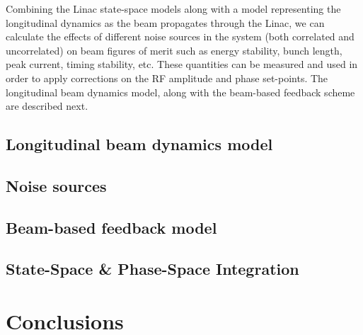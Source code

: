 \documentclass[a4paper,12pt]{article}
\begin{document}
Combining the Linac state-space models along with a model representing the longitudinal dynamics as the beam propagates through the Linac, we can calculate the effects of different noise sources in the system (both correlated and uncorrelated) on beam figures of merit such as energy stability, bunch length, peak current, timing stability, etc. These quantities can be measured and used in order to apply corrections on the RF amplitude and phase set-points. The longitudinal beam dynamics model, along with the beam-based feedback scheme are described next.

\subsection{Longitudinal beam dynamics model}
\label{sec:doublecompress}






\subsection{Noise sources}
\label{sec:beam_noise_sources}
\subsection{Beam-based feedback model}
\subsection{State-Space \& Phase-Space Integration}


\section{Conclusions}

\newpage
\end{document}
